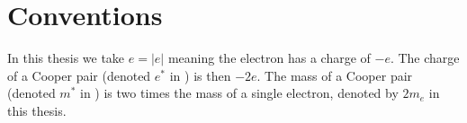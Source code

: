 \chapter*{Conventions}
In this thesis we take $e = |e|$ meaning the electron has a charge of $-e$. The charge of a Cooper pair (denoted $e^*$ in ) is then $-2e$. The mass of a Cooper pair (denoted $m^*$ in ) is two times the mass of a single electron, denoted by $2m_e$ in this thesis.